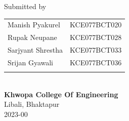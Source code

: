 \begin{center}
		\vspace{1in}
		\large{Submitted by}\\
		\vspace{0.2in}
		\begin{tabular}{p{3.5in}p{2in}}
			\hspace{0.3cm}Manish Pyakurel& \hspace{1cm}KCE077BCT020\\
			\hspace{0.3cm}Rupak Neupane& \hspace{1cm}KCE077BCT028\\
			\hspace{0.3cm}Sarjyant Shrestha& \hspace{1cm}KCE077BCT033\\
			\hspace{0.3cm}Srijan Gyawali& \hspace{1cm}KCE077BCT036\\
		 \vspace{0.2in}
		\end{tabular}
		\\
		\vspace{1cm}
			\vspace{1cm}
		\large{\textbf{Khwopa College Of Engineering}\\}
			\normalsize{Libali, Bhaktapur\\
			2023-00
		}
    \end{center}
